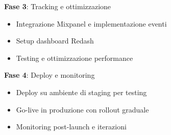 \textbf{Fase 3}: Tracking e ottimizzazione
\begin{itemize}
  \item Integrazione Mixpanel e implementazione eventi
  \item Setup dashboard Redash
  \item Testing e ottimizzazione performance
\end{itemize}

\textbf{Fase 4}: Deploy e monitoring
\begin{itemize}
  \item Deploy su ambiente di staging per testing
  \item Go-live in produzione con rollout graduale
  \item Monitoring post-launch e iterazioni
\end{itemize}